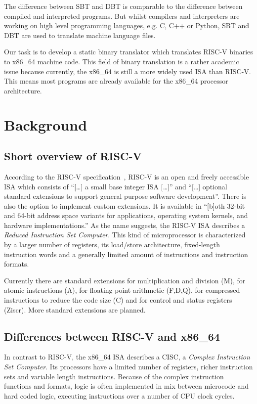 \documentclass[course=eragp]{aspdoc}
\begin{document}
\par 

The difference between SBT and DBT is comparable to the difference between compiled and interpreted
programs. But whilst compilers and interpreters are working on high level programming languages,
e.g. C, C++ or Python, SBT and DBT are used to translate machine language files.

\par 

Our task is to
develop a static binary translator which translates RISC-V binaries to x86\_64 machine code. This
field of binary translation is a rather academic issue because currently, the x86\_64 is still a
more widely used ISA than RISC-V. This means most programs are already available for the x86\_64
processor architecture.

\section{Background}
\subsection{Short overview of RISC-V}

According to the RISC-V specification~\cite{rvspec}, RISC-V is an open and freely accessible ISA
which consists of ``[\ldots] a small base integer ISA [\ldots]'' and ``[\ldots] optional standard
extensions to support general purpose software development''\cite[p.~1]{rvspec}. There is also
the option to implement custom extensions. It is available in
``[b]oth 32-bit and 64-bit address space variants for applications, operating system kernels, and
hardware implementations.''\cite[p.~1]{rvspec} As the name suggests, the RISC-V ISA describes a
\emph{Reduced Instruction Set Computer}. This kind of microprocessor is characterized by a larger
number of registers, its load/store architecture, fixed-length instruction words and a generally
limited amount of instructions and instruction formats.\cite{RISCvCISC}

\par

Currently there are standard extensions for multiplication and division (M), for atomic instructions (A),
for floating point arithmetic (F,D,Q), for compressed instructions to reduce the code size (C) and
for control and status registers (Ziscr). More standard extensions are planned.

\subsection{Differences between RISC-V and x86\_64}
In contrast to RISC-V, the x86\_64 ISA describes a CISC, a \emph{Complex Instruction Set Computer}.
Its processors have a limited number of registers, richer instruction sets and variable length
instructions. Because of the complex instruction functions and formats, logic is often implemented
in mix between microcode and hard coded logic, executing instructions over a number of CPU clock
cycles.\cite{RISCvCISC}
\end{document}

